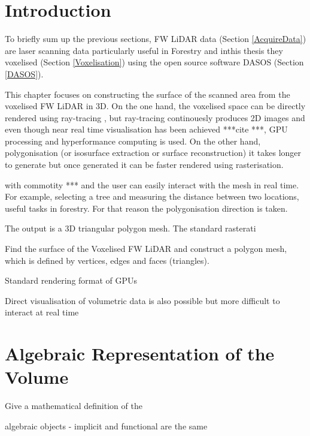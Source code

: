 \documentclass{subfiles}
\begin{document}
	

\section{Introduction}

\par To briefly sum up the previous sections, FW LiDAR data (Section \ref{AcquireData}) are laser scanning data particularly useful in Forestry and inthis thesis they voxelised (Section \ref{Voxelisation}) using the open source software DASOS (Section \ref{DASOS}).  

\par This chapter focuses on constructing the surface of the scanned area from the voxelised FW LiDAR in 3D. On the one hand, the voxelised space can be directly rendered using ray-tracing \cite{Hanrahan1983}, but ray-tracing continouesly produces 2D images and even though near real time visualisation has been achieved ***cite ***, GPU processing and hyperformance computing is used. On the other hand, polygonisation (or isosurface extraction or surface reconstruction) it takes longer to generate but once generated it can be faster rendered using rasterisation. 

with commotity *** and the user can easily interact with the mesh in real time. For example, selecting a tree and measuring the distance between two locations, useful tasks in forestry. For that reason the polygonisation direction is taken.

\par The output is a 3D triangular polygon mesh. The standard rasterati

Find the surface of the Voxelised FW LiDAR and construct a polygon mesh, which is defined by vertices, edges and faces (triangles). 

Standard rendering format of GPUs 

Direct visualisation of volumetric data is also possible but more difficult to interact at real time 





\section{Algebraic Representation of the Volume}

Give a mathematical definition of the 

algebraic objects - implicit and functional are the same 
\end{document}
